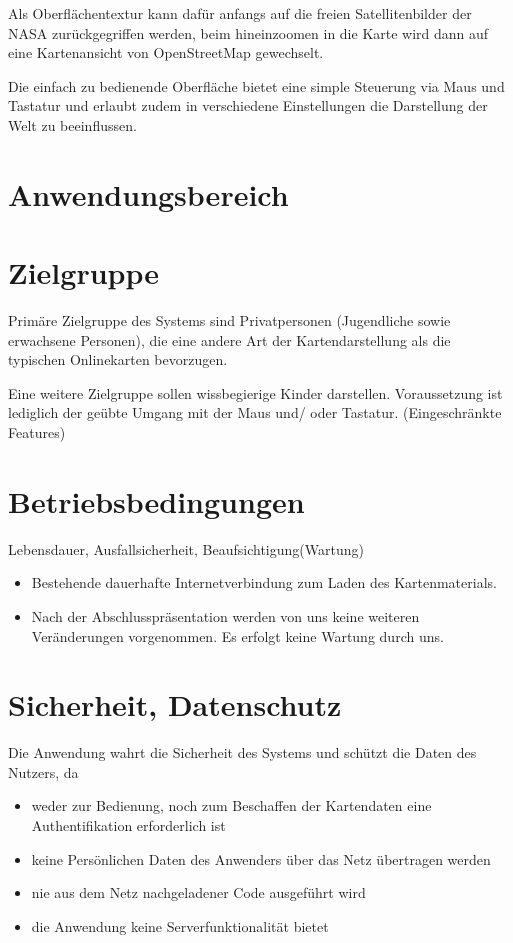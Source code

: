 \documentclass[10pt]{scrreprt}
\begin{document}
Als Oberflächentextur kann dafür anfangs auf die freien Satellitenbilder der
NASA zurückgegriffen werden, beim hineinzoomen in die Karte wird dann auf eine Kartenansicht von OpenStreetMap gewechselt.

Die einfach zu bedienende Oberfläche bietet eine simple Steuerung via Maus und Tastatur und erlaubt zudem in verschiedene Einstellungen die Darstellung der Welt zu beeinflussen. 


\section{Anwendungsbereich}


\section{Zielgruppe}
Primäre Zielgruppe des Systems sind Privatpersonen (Jugendliche sowie erwachsene Personen), die eine andere Art der Kartendarstellung als die typischen Onlinekarten bevorzugen.

Eine weitere Zielgruppe sollen wissbegierige Kinder darstellen. Voraussetzung ist lediglich der geübte Umgang mit der Maus und/ oder Tastatur. (Eingeschränkte Features)

\section{Betriebsbedingungen}
Lebensdauer, Ausfallsicherheit, Beaufsichtigung(Wartung)

\begin{itemize}
\item Bestehende dauerhafte Internetverbindung zum Laden des Kartenmaterials.
\item Nach  der  Abschlusspräsentation  werden  von  uns  keine  weiteren 
Veränderungen vorgenommen. Es erfolgt keine Wartung durch uns.
\end{itemize} 

\section{Sicherheit, Datenschutz}
Die Anwendung wahrt die Sicherheit des Systems und schützt die Daten des Nutzers, da
\begin{itemize}
\item weder zur Bedienung, noch zum Beschaffen der Kartendaten eine Authentifikation erforderlich ist
\item keine Persönlichen Daten des Anwenders über das Netz übertragen werden
\item nie aus dem Netz nachgeladener Code ausgeführt wird
\item die Anwendung keine Serverfunktionalität bietet
\end{itemize}
\end{document}
